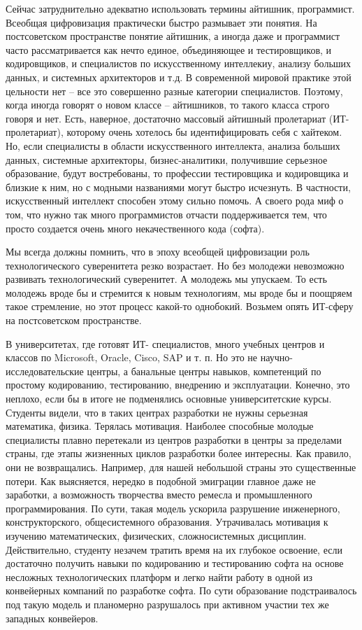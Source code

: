 Сейчас затруднительно адекватно использовать термины айтишник, программист. Всеобщая цифровизация практически быстро размывает эти понятия. На постсоветском пространстве понятие айтишник, а иногда даже и программист часто рассматривается как нечто единое, объединяющее и тестировщиков, и кодировщиков, и специалистов по искусственному интеллекиу, анализу больших данных, и системных архитекторов и т.д. В современной мировой практике  этой цельности нет – все это совершенно разные категории специалистов. Поэтому, когда иногда говорят о новом классе – айтишников, то такого класса строго говоря и нет. Есть, наверное, достаточно массовый айтишный пролетариат (ИТ-пролетариат), которому очень хотелось бы идентифицировать себя с хайтеком. Но, если специалисты в области искусственного интеллекта, анализа больших данных, системные архитекторы, бизнес-аналитики, получившие серьезное образование, будут востребованы, то профессии тестировщика и кодировщика и близкие к ним, но с модными названиями могут быстро исчезнуть. В частности, искусственный интеллект способен этому сильно помочь. А своего рода миф о том, что нужно так много программистов отчасти поддерживается тем, что просто создается очень много некачественного кода (софта).

Мы всегда должны помнить, что в эпоху всеобщей цифровизации роль технологического суверенитета резко возрастает. Но без молодежи невозможно развивать технологический суверенитет. А молодежь мы упускаем. То есть молодежь вроде бы и стремится к новым технологиям, мы вроде бы и поощряем такое стремление, но этот процесс какой-то однобокий. Возьмем опять ИТ-сферу на постсоветском пространстве.
 
В университетах, где готовят ИТ- специалистов, много учебных центров и классов по Microsoft, Oracle, Cisco, SAP и т. п. Но это не научно-исследовательские центры, а банальные центры навыков, компетенций по простому кодированию, тестированию, внедрению и эксплуатации. Конечно, это неплохо, если бы в итоге не подменялись основные университетские курсы. Студенты видели, что в таких центрах разработки не нужны серьезная математика, физика. Терялась мотивация. Наиболее способные молодые специалисты плавно перетекали из центров разработки в центры за пределами страны, где этапы жизненных циклов разработки более интересны. Как правило, они не возвращались. Например, для нашей небольшой страны это существенные потери. Как выясняется, нередко в подобной эмиграции главное даже не заработки, а возможность творчества вместо ремесла и промышленного программирования. По сути, такая модель ускорила разрушение инженерного, конструкторского, общесистемного образования. Утрачивалась мотивация к изучению математических, физических, сложносистемных дисциплин. Действительно, студенту незачем тратить время на их глубокое освоение, если достаточно получить навыки по кодированию и тестированию софта на основе несложных технологических платформ и легко найти работу в одной из конвейерных компаний по разработке софта. По сути образование подстраивалось под такую модель и планомерно разрушалось при активном участии тех же западных конвейеров. 

